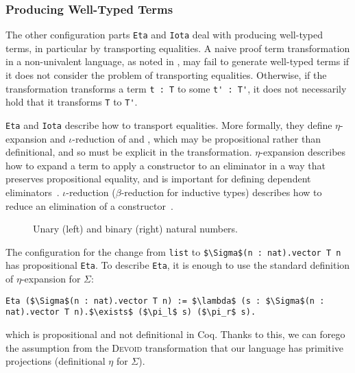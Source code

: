 \subsubsection{Producing Well-Typed Terms}
\label{sec:equality}

The other configuration parts \lstinline{Eta} and \lstinline{Iota} deal with producing well-typed terms,
in particular by transporting equalities.
A naive proof term transformation in a non-univalent language, as noted in \citet{tabareau2019marriage},
may fail to generate well-typed terms if it does not consider the problem of transporting equalities.
Otherwise, if the transformation transforms a term \lstinline{t : T} to some \lstinline{t' : T'}, it does not necessarily
hold that it transforms \lstinline{T} to \lstinline{T'}.

\lstinline{Eta} and \lstinline{Iota} describe how to transport equalities.
More formally, they define $\eta$-expansion and $\iota$-reduction of \A and \B,
which may be propositional rather than definitional, and so must be explicit in the transformation.
$\eta$-expansion describes how to expand a term to apply a constructor to an eliminator in a way that preserves propositional equality,
and is important for defining dependent eliminators~\cite{nlab:eta-conversion}.
$\iota$-reduction ($\beta$-reduction for inductive types) describes how to reduce an elimination of a constructor~\cite{nlab:beta-reduction}.

\begin{figure}
\begin{minipage}{0.48\textwidth}
   
\end{minipage}
\hfill
\begin{minipage}{0.48\textwidth}
   
\end{minipage}
\vspace{-0.3cm}
\caption{Unary (left) and binary (right) natural numbers.}
\label{fig:nattobin}
\end{figure}

The configuration for the change from \lstinline{list} to \lstinline{$\Sigma$(n : nat).vector T n} has propositional \lstinline{Eta}.
To describe \lstinline{Eta}, it is enough to use the standard definition of $\eta$-expansion for $\Sigma$:

\begin{lstlisting}
Eta ($\Sigma$(n : nat).vector T n) := $\lambda$ (s : $\Sigma$(n : nat).vector T n).$\exists$ ($\pi_l$ s) ($\pi_r$ s).
\end{lstlisting}
which is propositional and not definitional in Coq.
Thanks to this, we can forego the assumption from the \textsc{Devoid} transformation
that our language has primitive projections (definitional $\eta$ for $\Sigma$).

